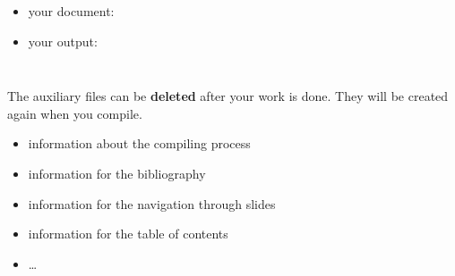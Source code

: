 {\begin{frame}
\begin{columns}

\begin{itemize}
	\item your document: 
	\item your output: 
\end{itemize}

\end{columns}

\end{frame}


\begin{frame}

\begin{minipage}{.58\textwidth}

The auxiliary files can be \textbf{deleted} after your work is done. They will be created again when you compile.

\begin{itemize}
	\item {} \ras information about the compiling process
	
	\item {} \ras information for the bibliography
	
	\item {} \ras information for the navigation through slides
	
	\item {} \ras information for the table of contents
		
	\item \dots 
\end{itemize}


\end{minipage}
\end{frame}}
